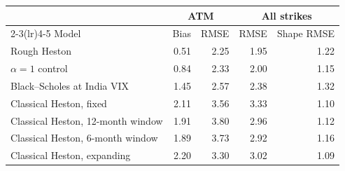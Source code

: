 \begin{tabular}{lrrrr}
\toprule
 & \multicolumn{2}{c}{ATM} & \multicolumn{2}{c}{All strikes} \\
\cmidrule(lr){2-3}\cmidrule(lr){4-5}
Model & Bias & RMSE & RMSE & Shape RMSE \\
\midrule
Rough Heston & 0.51 & 2.25 & 1.95 & 1.22 \\
$\alpha=1$ control & 0.84 & 2.33 & 2.00 & 1.15 \\
Black--Scholes at India VIX & 1.45 & 2.57 & 2.38 & 1.32 \\
Classical Heston, fixed & 2.11 & 3.56 & 3.33 & 1.10 \\
Classical Heston, 12-month window & 1.91 & 3.80 & 2.96 & 1.12 \\
Classical Heston, 6-month window & 1.89 & 3.73 & 2.92 & 1.16 \\
Classical Heston, expanding & 2.20 & 3.30 & 3.02 & 1.09 \\
\bottomrule
\end{tabular}
